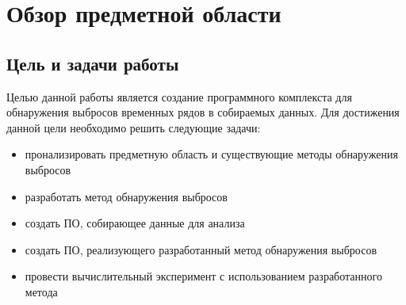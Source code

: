 \chapter{Обзор предметной области}
\label{cha:analysis}
\section{Цель и задачи работы}
Целью данной работы является создание программного комплекста для обнаружения выбросов временных рядов в собираемых данных.
Для достижения данной цели необходимо решить следующие задачи:
\begin{itemize}
	\item пронализировать предметную область и существующие методы обнаружения выбросов
	\item разработать метод обнаружения выбросов
	\item создать ПО, собирающее данные для анализа
	\item создать ПО, реализующего  разработанный метод обнаружения выбросов
	\item провести вычислительный эксперимент с использованием разработанного метода
	
\end{itemize}
